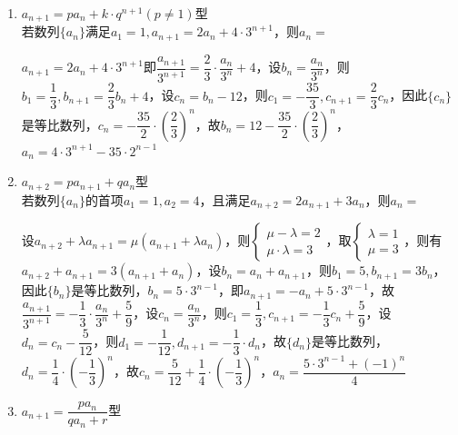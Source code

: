 \begin{enumerate}
\begin{enumerate}
\begin{jieda}
        \end{jieda}
        \item $a_{n+1} = pa_n + k \cdot q^{n+1} (p \neq 1)$型 \\
        若数列$\{a_n\}$满足$a_1 = 1, a_{n+1} = 2a_n + 4 \cdot 3^{n+1}$，则$a_n = $
        \begin{jieda}
            $a_{n+1} = 2a_n + 4 \cdot 3^{n+1}$即$\dfrac{a_{n+1}}{3^{n+1}} = \dfrac{2}{3} \cdot \dfrac{a_n}{3^n} + 4$，设$b_n = \dfrac{a_n}{3^n}$，则$b_1 = \dfrac{1}{3}, b_{n+1} = \dfrac{2}{3}b_n + 4$，设$c_n = b_n - 12$，则$c_1 = -\dfrac{35}{3}, c_{n+1} = \dfrac{2}{3}c_n$，因此$\{c_n\}$是等比数列，$c_n = -\dfrac{35}{2} \cdot \left ( \dfrac{2}{3} \right )^n$，故$b_n = 12 - \dfrac{35}{2}  \cdot \left ( \dfrac{2}{3} \right )^n$，$a_n = 4 \cdot 3^{n+1} - 35 \cdot 2^{n-1}$
        \end{jieda}
        \item $a_{n+2} = pa_{n+1} + qa_n$型 \\
        若数列$\{a_n\}$的首项$a_1 = 1, a_2 = 4$，且满足$a_{n+2} = 2a_{n+1}+3a_n$，则$a_n = $
        \begin{jieda}
            设$a_{n+2} + \lambda a_{n+1} = \mu(a_{n+1} + \lambda a_n)$，则$\left \{ \begin{array}{l}
                \mu - \lambda = 2 \\
                \mu \cdot \lambda = 3
            \end{array} \right.$，取$\left \{ \begin{array}{l}
                \lambda = 1 \\
                \mu = 3
            \end{array} \right.$，则有$a_{n+2} + a_{n+1} = 3(a_{n+1} + a_n)$，设$b_n = a_n + a_{n+1}$，则$b_1 = 5, b_{n+1} = 3b_n$，因此$\{b_n\}$是等比数列，$b_n = 5 \cdot 3^{n-1}$，即$a_{n+1} = -a_n + 5 \cdot 3^{n-1}$，故$\dfrac{a_{n+1}}{3^{n+1}} = -\dfrac{1}{3} \cdot \dfrac{a_n}{3^n} + \dfrac{5}{9}$，设$c_n = \dfrac{a_n}{3^n}$，则$c_1 = \dfrac{1}{3}, c_{n+1} = -\dfrac{1}{3} c_n + \dfrac{5}{9}$，设$d_n = c_n - \dfrac{5}{12}$，则$d_1 = -\dfrac{1}{12}, d_{n+1} = -\dfrac{1}{3}\cdot d_n$，故$\{d_n\}$是等比数列，$d_n = \dfrac{1}{4} \cdot \left (-\dfrac{1}{3} \right)^n$，故$c_n = \dfrac{5}{12} + \dfrac{1}{4} \cdot \left (-\dfrac{1}{3} \right)^n$，$a_n = \dfrac{5 \cdot 3^{n-1} + (-1)^n}{4}$
        \end{jieda}
        \item $a_{n+1} = \dfrac{pa_n}{qa_n+r}$型 \\

\end{enumerate}
\end{enumerate}
